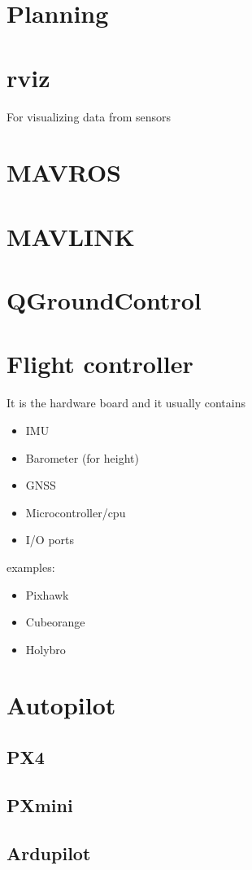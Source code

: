 \section{Planning}
\section{rviz}
    For visualizing data from sensors
\section{MAVROS}
\section{MAVLINK}
\section{QGroundControl}
\section{Flight controller}
    It is the hardware board and it usually contains
    \begin{itemize}
        \item IMU
        \item Barometer (for height)
        \item GNSS
        \item Microcontroller/cpu
        \item I/O ports
    \end{itemize}

    examples:
    \begin{itemize}
        \item Pixhawk
        \item Cubeorange
        \item Holybro
    \end{itemize}

\section{Autopilot}
    \subsection{PX4}
        \subsection{PXmini}
    \subsection{Ardupilot}